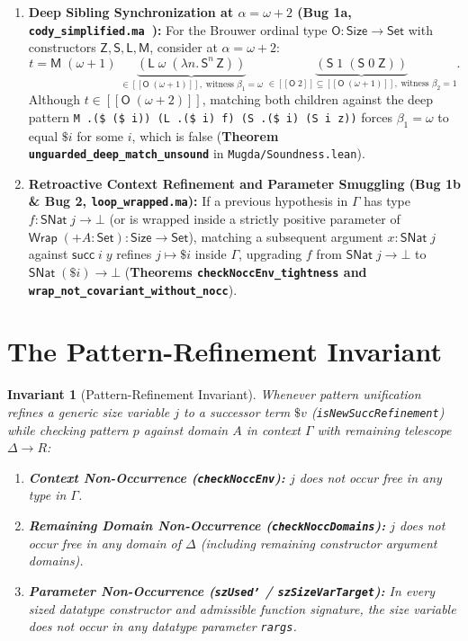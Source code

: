 \documentclass[11pt,a4paper]{article}
\newcommand{\llbracket}{[\![}
\newcommand{\rrbracket}{]\!]}
\newtheorem{invariant}[theorem]{Invariant}
\begin{document}
\begin{enumerate}
  \item \textbf{Deep Sibling Synchronization at $\alpha = \omega + 2$ (Bug 1a, \texttt{cody\_simplified.ma}~\cite{roux2016}):}
  For the Brouwer ordinal type $\mathsf{O} : \mathsf{Size} \to \mathsf{Set}$ with constructors $\mathsf{Z}, \mathsf{S}, \mathsf{L}, \mathsf{M}$, consider at $\alpha = \omega + 2$:
  \[
    t = \mathsf{M}\;(\omega + 1)\;\underbrace{(\mathsf{L}\;\omega\;(\lambda n.\,\mathsf{S}^n\,\mathsf{Z}))}_{\in \llbracket \mathsf{O}\;(\omega + 1) \rrbracket,\; \text{witness } \beta_1 = \omega}\;\underbrace{(\mathsf{S}\;1\;(\mathsf{S}\;0\;\mathsf{Z}))}_{\in \llbracket \mathsf{O}\;2 \rrbracket \subseteq \llbracket \mathsf{O}\;(\omega + 1) \rrbracket,\; \text{witness } \beta_2 = 1}.
  \]
  Although $t \in \llbracket \mathsf{O}\;(\omega + 2) \rrbracket$, matching both children against the deep pattern
  \texttt{M .(\$ (\$ i)) (L .(\$ i) f) (S .(\$ i) (S i z))} forces $\beta_1 = \omega$ to equal $\$ i$ for some $i$, which is false (\textbf{Theorem \texttt{unguarded\_deep\_match\_unsound}} in \texttt{Mugda/Soundness.lean}).

  \item \textbf{Retroactive Context Refinement and Parameter Smuggling (Bug 1b \& Bug 2, \texttt{loop\_wrapped.ma}):}
  If a previous hypothesis in $\Gamma$ has type $f : \mathsf{SNat}\;j \to \bot$ (or is wrapped inside a strictly positive parameter of $\mathsf{Wrap}\;(+ A : \mathsf{Set}) : \mathsf{Size} \to \mathsf{Set}$), matching a subsequent argument $x : \mathsf{SNat}\;j$ against $\mathsf{succ}\;i\;y$ refines $j \mapsto \$ i$ inside $\Gamma$, upgrading $f$ from $\mathsf{SNat}\;j \to \bot$ to $\mathsf{SNat}\;(\$ i) \to \bot$ (\textbf{Theorems \texttt{checkNoccEnv\_tightness} and \texttt{wrap\_not\_covariant\_without\_nocc}}).
\end{enumerate}

\section{The Pattern-Refinement Invariant}

\begin{invariant}[Pattern-Refinement Invariant]
Whenever pattern unification refines a generic size variable $j$ to a successor term $\$ v$ (\texttt{isNewSuccRefinement}) while checking pattern $p$ against domain $A$ in context $\Gamma$ with remaining telescope $\Delta \to R$:
\begin{enumerate}
  \item \textbf{Context Non-Occurrence (\texttt{checkNoccEnv}):} $j$ does not occur free in any type in $\Gamma$.
  \item \textbf{Remaining Domain Non-Occurrence (\texttt{checkNoccDomains}):} $j$ does not occur free in any domain of $\Delta$ (including remaining constructor argument domains).
  \item \textbf{Parameter Non-Occurrence (\texttt{szUsed'} / \texttt{szSizeVarTarget}):} In every sized datatype constructor and admissible function signature, the size variable does not occur in any datatype parameter \texttt{rargs}.
\end{enumerate}
\end{invariant}
\end{document}
